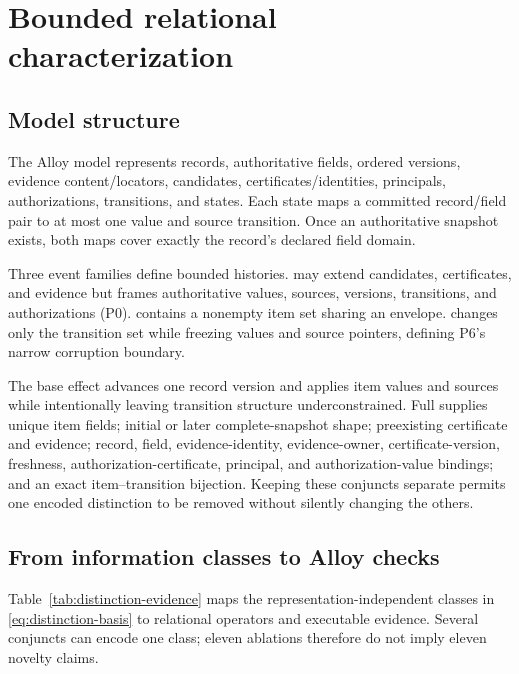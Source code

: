 \section{Bounded relational characterization}
\label{sec:alloy}

\subsection{Model structure}

The Alloy model represents records, authoritative fields, ordered versions, evidence content/locators, candidates, certificates/identities, principals, authorizations, transitions, and states. Each state maps a committed record/field pair to at most one value and source transition. Once an authoritative snapshot exists, both maps cover exactly the record's declared field domain.

Three event families define bounded histories.  may extend candidates, certificates, and evidence but frames authoritative values, sources, versions, transitions, and authorizations (P0).  contains a nonempty item set sharing an envelope.  changes only the transition set while freezing values and source pointers, defining P6's narrow corruption boundary.

The base effect advances one record version and applies item values and sources while intentionally leaving transition structure underconstrained. Full supplies unique item fields; initial or later complete-snapshot shape; preexisting certificate and evidence; record, field, evidence-identity, evidence-owner, certificate-version, freshness, authorization-certificate, principal, and authorization-value bindings; and an exact item--transition bijection. Keeping these conjuncts separate permits one encoded distinction to be removed without silently changing the others.

\subsection{From information classes to Alloy checks}

Table~\ref{tab:distinction-evidence} maps the representation-independent classes in \cref{eq:distinction-basis} to relational operators and executable evidence. Several conjuncts can encode one class; eleven ablations therefore do not imply eleven novelty claims.

